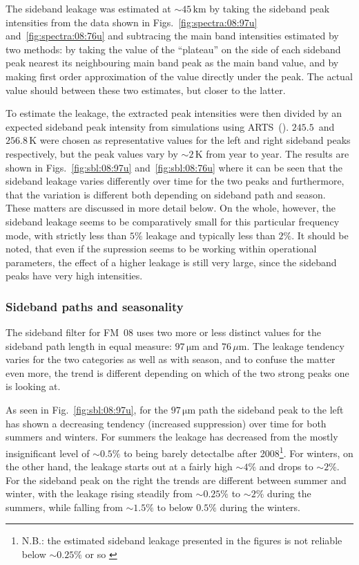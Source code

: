 \noindent
The sideband leakage was estimated at $\sim45\,\mathrm{km}$ by taking the
sideband peak intensities from the data shown in Figs.~\ref{fig:spectra:08:97u}
and~\ref{fig:spectra:08:76u} and subtracing the main band intensities estimated
by two methods:  by taking the value of the ``plateau'' on the side of each
sideband peak nearest its neighbouring main band peak as the main band value, and
by making first order approximation of the value directly under the peak.  The
actual value should between these two estimates, but closer to the latter.

To estimate the leakage, the extracted peak intensities were then divided by an
expected sideband peak intensity from simulations using
ARTS~(\cite{buehler:artst:05}).  $245.5$~and $256.8\,\mathrm{K}$ were chosen as
representative values for the left and right sideband peaks respectively, but
the peak values vary by $\sim2\,\mathrm{K}$ from year to year.  The results are
shown in Figs.~\ref{fig:sbl:08:97u} and~\ref{fig:sbl:08:76u} where it can be
seen that the sideband leakage varies differently over time for the two peaks
and furthermore, that the variation is different both depending on sideband
path and season.  These matters are discussed in more detail below.  On the
whole, however, the sideband leakage seems to be comparatively small for this
particular frequency mode, with strictly less than $5\%$ leakage and typically
less than $2\%$.  It should be noted, that even if the supression seems to be
working within operational parameters, the effect of a higher leakage is still
very large, since the sideband peaks have very high intensities.


\subsubsection{Sideband paths and seasonality}
\label{FM08:sbpath}
\label{FM08:seasonality}
The sideband filter for FM~08 uses two more or less distinct values for the
sideband path length in equal measure: $97\,\mathrm{\mu m}$ and
$76\,\mu\mathrm{m}$.  The leakage tendency varies for the two categories as
well as with season, and to confuse the matter even more, the trend is
different depending on which of the two strong peaks one is looking at.

As seen in Fig.~\ref{fig:sbl:08:97u}, for the $97\,\mathrm{\mu m}$ path the
sideband peak to the left has shown a decreasing tendency (increased
suppression) over time for both summers and winters. For summers the
leakage has decreased from the mostly insignificant level of $\sim0.5\%$ to
being barely detectalbe after 2008\footnote{N.B.: the estimated sideband
leakage presented in the figures is not reliable below $\sim0.25\%$ or so
\label{fn:sblestimate}}. For winters, on the other hand, the leakage starts out
at a fairly high $\sim4\%$ and drops to $\sim2\%$. For the sideband peak on the
right the trends are different between summer and winter, with the leakage
rising steadily from $\sim0.25\%$ to $\sim2\%$ during the summers, while
falling from $\sim1.5\%$ to below $0.5\%$ during the
winters.

